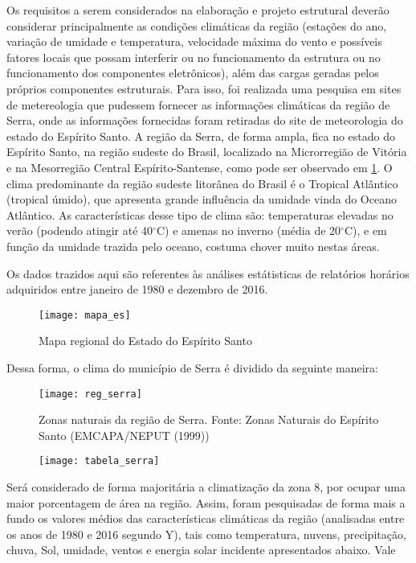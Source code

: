 Os requisitos a serem considerados na elabora\c c\~ao e projeto estrutural dever\~ao considerar principalmente as condi\c c\~oes clim\'aticas da regi\~ao (esta\c c\~oes do ano, varia\c c\~ao de umidade e temperatura, velocidade m\'axima do vento e poss\'iveis fatores locais que possam interferir ou no funcionamento da estrutura ou no funcionamento dos componentes eletr\^onicos), al\'em das cargas geradas pelos próprios componentes estruturais. Para isso, foi realizada uma pesquisa em sites de metereologia que pudessem fornecer as informa\c c\~oes clim\'aticas da regi\~ao de Serra, onde as informações fornecidas foram retiradas do site de meteorologia do estado do Esp\'irito Santo.
A regi\~ao da Serra, de forma ampla, fica no estado do Esp\'irito Santo, na regi\~ao sudeste do Brasil, localizado na Microrregi\~ao de Vit\'oria e na Mesorregi\~ao Central Esp\'irito-Santense, como pode ser observado em \ref{mapa_es}. O clima predominante da regi\~ao sudeste litor\^anea do Brasil \'e o Tropical Atl\^antico (tropical \'umido), que apresenta grande influ\^encia da umidade vinda do Oceano Atl\^antico. As caracter\'isticas desse tipo de clima s\~ao: temperaturas elevadas no ver\~ao (podendo atingir at\'e 40$^\circ$C) e amenas no inverno (m\'edia de 20$^\circ$C), e em fun\c c\~ao da umidade trazida pelo oceano, costuma chover muito nestas \'areas.

Os dados trazidos aqui são referentes às análises estátisticas de relatórios horários adquiridos entre janeiro de 1980 e dezembro de 2016. 

\begin{figure}[h]
	\texttt{[image: mapa\_es]}
	\centering
	\caption{Mapa regional do Estado do Espírito Santo}
	\label{mapa_es}
	
\end{figure}
Dessa forma, o clima do município de Serra é dividido da seguinte maneira:

\begin{figure}[!ht]
	\texttt{[image: reg\_serra]}
	\centering
	\caption{Zonas naturais da região de Serra. Fonte: Zonas Naturais do Espírito Santo (EMCAPA/NEPUT (1999))}
	\label{regiao_serra}
\end{figure}

\begin{figure}[!ht]
	\texttt{[image: tabela\_serra]}
	\centering
\end{figure}

Será considerado de forma majoritária a climatização da zona 8, por ocupar uma maior porcentagem de área na região.
Assim, foram pesquisadas de forma mais a fundo os valores médios das características climáticas da região (analisadas entre os anos de 1980 e 2016 segundo Y), tais como temperatura, nuvens, precipitação, chuva, Sol, umidade, ventos e energia solar incidente apresentados abaixo. Vale  

